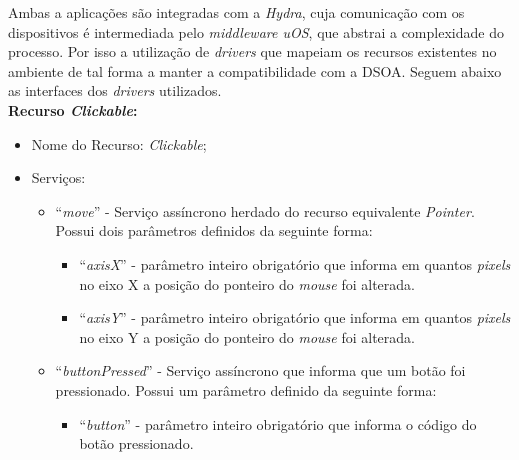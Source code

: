 Ambas a aplicações são integradas com a \emph{Hydra}, cuja comunicação com os dispositivos é intermediada pelo \emph{middleware uOS}, que abstrai a complexidade do processo. Por isso a utilização de \emph{drivers} que mapeiam os recursos existentes no ambiente de tal forma a manter a compatibilidade com a DSOA. Seguem abaixo as interfaces dos \emph{drivers} utilizados. \\

\textbf{Recurso \emph{Clickable}:}

\begin{itemize}
	
	\item Nome do Recurso: \emph{Clickable};

	\item Serviços:
		
		\begin{itemize}

			\item ``\emph{move}'' - Serviço assíncrono herdado do recurso equivalente \emph{Pointer}. Possui dois parâmetros definidos da seguinte forma:

				\begin{itemize}
					\item ``\emph{axisX}'' - parâmetro inteiro obrigatório que informa em quantos \emph{pixels} no eixo X a posição do ponteiro do \emph{mouse} foi alterada.

					\item ``\emph{axisY}'' - parâmetro inteiro obrigatório que informa em quantos \emph{pixels} no eixo Y a posição do ponteiro do \emph{mouse} foi alterada.
				\end{itemize}
			
			\item ``\emph{buttonPressed}'' - Serviço assíncrono que informa que um botão foi pressionado. Possui um parâmetro definido da seguinte forma:

				\begin{itemize}
					\item ``\emph{button}'' - parâmetro inteiro obrigatório que informa o código do botão pressionado.
				\end{itemize}
			

\end{itemize}
\end{itemize}
